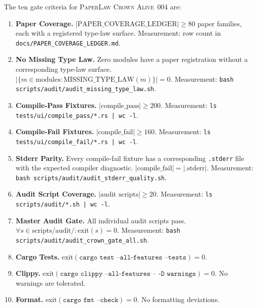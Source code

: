 The ten gate criteria for \textsc{PaperLaw Crown Alive~004} are:

\begin{enumerate}
  \item[\textbf{G1.}] \textbf{Paper Coverage.}
    $|\text{PAPER\_COVERAGE\_LEDGER}| \geq 80$ paper families, each with a registered
    type-law surface. Measurement: row count in \texttt{docs/PAPER\_COVERAGE\_LEDGER.md}.

  \item[\textbf{G2.}] \textbf{No Missing Type Law.}
    Zero modules have a paper registration without a corresponding type-law surface.
    $|\{m \in \text{modules} : \text{MISSING\_TYPE\_LAW}(m)\}| = 0$.
    Measurement: \texttt{bash scripts/audit/audit\_missing\_type\_law.sh}.

  \item[\textbf{G3.}] \textbf{Compile-Pass Fixtures.}
    $|\text{compile\_pass}| \geq 200$.
    Measurement: \texttt{ls tests/ui/compile\_pass/*.rs | wc -l}.

  \item[\textbf{G4.}] \textbf{Compile-Fail Fixtures.}
    $|\text{compile\_fail}| \geq 160$.
    Measurement: \texttt{ls tests/ui/compile\_fail/*.rs | wc -l}.

  \item[\textbf{G5.}] \textbf{Stderr Parity.}
    Every compile-fail fixture has a corresponding \texttt{.stderr} file with the expected
    compiler diagnostic. $|\text{compile\_fail}| = |\text{.stderr}|$.
    Measurement: \texttt{bash scripts/audit/audit\_stderr\_quality.sh}.

  \item[\textbf{G6.}] \textbf{Audit Script Coverage.}
    $|\text{audit scripts}| \geq 20$.
    Measurement: \texttt{ls scripts/audit/*.sh | wc -l}.

  \item[\textbf{G7.}] \textbf{Master Audit Gate.}
    All individual audit scripts pass.
    $\forall s \in \text{scripts/audit/}: \text{exit}(s) = 0$.
    Measurement: \texttt{bash scripts/audit/audit\_crown\_gate\_all.sh}.

  \item[\textbf{G8.}] \textbf{Cargo Tests.}
    $\text{exit}(\texttt{cargo test --all-features --tests}) = 0$.

  \item[\textbf{G9.}] \textbf{Clippy.}
    $\text{exit}(\texttt{cargo clippy --all-features -- -D warnings}) = 0$.
    No warnings are tolerated.

  \item[\textbf{G10.}] \textbf{Format.}
    $\text{exit}(\texttt{cargo fmt --check}) = 0$.
    No formatting deviations.
\end{enumerate}

